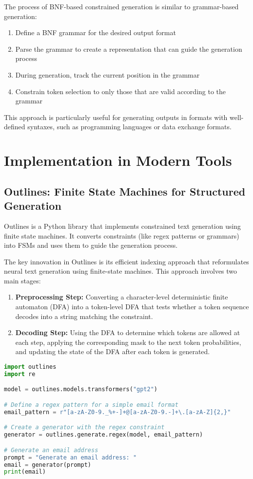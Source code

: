 \documentclass{article}
\begin{document}
The process of BNF-based constrained generation is similar to grammar-based generation:
\begin{enumerate}
    \item Define a BNF grammar for the desired output format
    \item Parse the grammar to create a representation that can guide the generation process
    \item During generation, track the current position in the grammar
    \item Constrain token selection to only those that are valid according to the grammar
\end{enumerate}

This approach is particularly useful for generating outputs in formats with well-defined syntaxes, such as programming languages or data exchange formats.

\section{Implementation in Modern Tools}

\subsection{Outlines: Finite State Machines for Structured Generation}

Outlines is a Python library that implements constrained text generation using finite state machines. It converts constraints (like regex patterns or grammars) into FSMs and uses them to guide the generation process.

The key innovation in Outlines is its efficient indexing approach that reformulates neural text generation using finite-state machines. This approach involves two main stages:

\begin{enumerate}
    \item \textbf{Preprocessing Step:} Converting a character-level deterministic finite automaton (DFA) into a token-level DFA that tests whether a token sequence decodes into a string matching the constraint.
    \item \textbf{Decoding Step:} Using the DFA to determine which tokens are allowed at each step, applying the corresponding mask to the next token probabilities, and updating the state of the DFA after each token is generated.
\end{enumerate}

\begin{lstlisting}[language=Python, caption=Using Outlines with regex constraints]
import outlines
import re

model = outlines.models.transformers("gpt2")

# Define a regex pattern for a simple email format
email_pattern = r"[a-zA-Z0-9._%+-]+@[a-zA-Z0-9.-]+\.[a-zA-Z]{2,}"

# Create a generator with the regex constraint
generator = outlines.generate.regex(model, email_pattern)

# Generate an email address
prompt = "Generate an email address: "
email = generator(prompt)
print(email)
\end{lstlisting}
\end{document}
